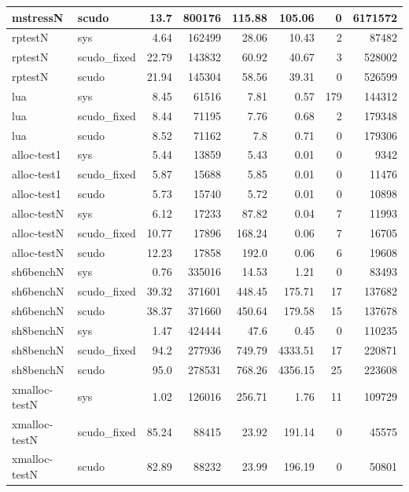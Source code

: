 \documentclass[a4paper,11pt,oneside]{report}
\begin{document}
\begin{longtable}[h]{l l r r r r r r}
  \midrule
  mstressN & scudo & 13.7 & 800176 & 115.88 & 105.06 & 0 & 6171572 \\
  \midrule
  rptestN & sys & 4.64 & 162499 & 28.06 & 10.43 & 2 & 87482 \\
  \midrule
  rptestN & scudo\_fixed & 22.79 & 143832 & 60.92 & 40.67 & 3 & 528002 \\
  \midrule
  rptestN & scudo & 21.94 & 145304 & 58.56 & 39.31 & 0 & 526599 \\
  \midrule
  lua & sys & 8.45 & 61516 & 7.81 & 0.57 & 179 & 144312 \\
  \midrule
  lua & scudo\_fixed & 8.44 & 71195 & 7.76 & 0.68 & 2 & 179348 \\
  \midrule
  lua & scudo & 8.52 & 71162 & 7.8 & 0.71 & 0 & 179306 \\
  \midrule
  alloc-test1 & sys & 5.44 & 13859 & 5.43 & 0.01 & 0 & 9342 \\
  \midrule
  alloc-test1 & scudo\_fixed & 5.87 & 15688 & 5.85 & 0.01 & 0 & 11476 \\
  \midrule
  alloc-test1 & scudo & 5.73 & 15740 & 5.72 & 0.01 & 0 & 10898 \\
  \midrule
  alloc-testN & sys & 6.12 & 17233 & 87.82 & 0.04 & 7 & 11993 \\
  \midrule
  alloc-testN & scudo\_fixed & 10.77 & 17896 & 168.24 & 0.06 & 7 & 16705 \\
  \midrule
  alloc-testN & scudo & 12.23 & 17858 & 192.0 & 0.06 & 6 & 19608 \\
  \midrule
  sh6benchN & sys & 0.76 & 335016 & 14.53 & 1.21 & 0 & 83493 \\
  \midrule
  sh6benchN & scudo\_fixed & 39.32 & 371601 & 448.45 & 175.71 & 17 & 137682 \\
  \midrule
  sh6benchN & scudo & 38.37 & 371660 & 450.64 & 179.58 & 15 & 137678 \\
  \midrule
  sh8benchN & sys & 1.47 & 424444 & 47.6 & 0.45 & 0 & 110235 \\
  \midrule
  sh8benchN & scudo\_fixed & 94.2 & 277936 & 749.79 & 4333.51 & 17 & 220871 \\
  \midrule
  sh8benchN & scudo & 95.0 & 278531 & 768.26 & 4356.15 & 25 & 223608 \\
  \midrule
  xmalloc-testN & sys & 1.02 & 126016 & 256.71 & 1.76 & 11 & 109729 \\
  \midrule
  xmalloc-testN & scudo\_fixed & 85.24 & 88415 & 23.92 & 191.14 & 0 & 45575 \\
  \midrule
  xmalloc-testN & scudo & 82.89 & 88232 & 23.99 & 196.19 & 0 & 50801 \\

\end{longtable}
\end{document}
